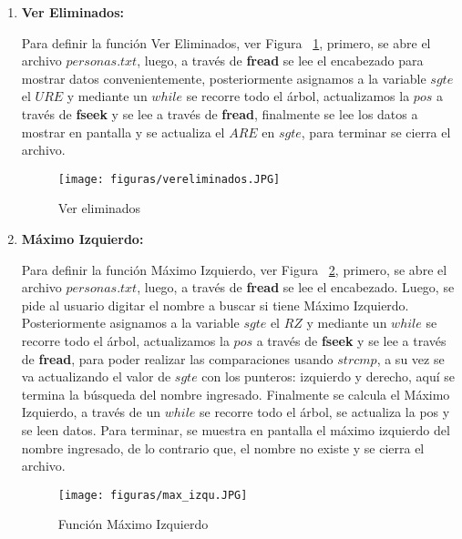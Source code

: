 \documentclass[10pt,conference]{IEEEtran}
\begin{document}
\begin{enumerate}[]
     \item {\textbf{Ver Eliminados:}}  
     \par Para definir la función Ver Eliminados, ver Figura ~\ref{fvereliminar}, primero, se abre el archivo $personas.txt$, luego, a través de \textbf{fread} se lee el encabezado para mostrar datos convenientemente, posteriormente asignamos a la variable $sgte$ el $URE$ y mediante un $while$ se recorre todo el árbol, actualizamos la $pos$ a través de \textbf{fseek} y se lee a través de \textbf{fread}, finalmente se lee los datos a mostrar en pantalla y se actualiza el $ARE$ en $sgte$, para terminar se cierra el archivo.
        \begin{figure}[H]
            \begin{center}
            \texttt{[image: figuras/vereliminados.JPG]}
            \caption{Ver eliminados}
             \label{fvereliminar} 
             \end{center}
        \end{figure}
        
     \item {\textbf{Máximo Izquierdo:}} 
     \par Para definir la función Máximo Izquierdo, ver Figura ~\ref{fmax}, primero, se abre el archivo $personas.txt$, luego, a través de \textbf{fread} se lee el encabezado. Luego, se pide al usuario digitar el nombre a buscar si tiene Máximo Izquierdo. Posteriormente asignamos a la variable $sgte$ el $RZ$ y mediante un $while$ se recorre todo el árbol, actualizamos la $pos$ a través de \textbf{fseek} y se lee a través de \textbf{fread}, para poder realizar las comparaciones usando $strcmp$, a su vez se va actualizando el valor de $sgte$ con los punteros: izquierdo y derecho, aquí se termina la búsqueda del nombre ingresado. Finalmente se calcula el Máximo Izquierdo, a través de un $while$ se recorre todo el árbol, se actualiza la pos y se leen datos. Para terminar, se muestra en pantalla el máximo izquierdo del nombre ingresado, de lo contrario que, el nombre no existe y se cierra el archivo.
       \begin{figure}[H]
            \begin{center}
            \texttt{[image: figuras/max\_izqu.JPG]}
            \caption{Función Máximo Izquierdo}
             \label{fmax} 
             \end{center}
        \end{figure}
\end{enumerate}
\end{document}
